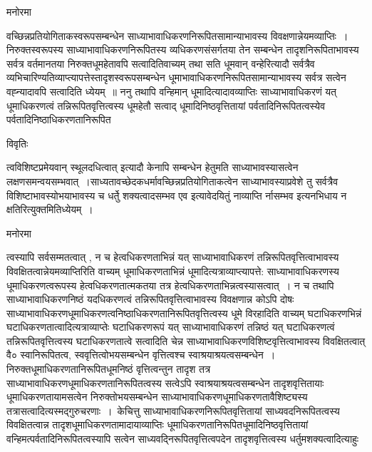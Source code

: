 \documentclass[10pt, openany]{book}
\begin{document}
{\begin{center}   मनोरमा  \end{center}
वच्छिन्नप्रतियोगिताकस्वरूपसम्बन्धेन साध्याभावाधिकरणनिरूपितसामान्याभावस्य विवक्षणान्नेयमव्याप्तिः~। निरुक्तस्वरूपस्य साध्याभावाधिकरणनिरूपितस्य व्यधिकरणसंसर्गतया तेन सम्बन्धेन तादृशनिरूपिताभावस्य सर्वत्र वर्तमानतया निरुक्तधूमहेतावपि सत्वादितिवाच्यम् तथा सति धूमवान् वन्हेरित्यादौ सर्वत्रैव
व्यभिचारिण्यतिव्याप्त्यापत्तेस्तादृशस्वरूपसम्बन्धेन धूमाभावाधिकरणनिरूपितसामान्याभावस्य सर्वत्र सत्वेन वह्न्यादावपि सत्वादिति ध्येयम्~॥ ननु तथापि वन्हिमान् धूमादित्यादावव्याप्तिः साध्याभावाधिकरणं यत् धूमाधिकरणत्वं तन्निरूपितवृत्तित्वस्य धूमहेतौ सत्वाद् धूमादिनिष्ठवृत्तितायां पर्वतादिनिरूपितत्वस्येव पर्वतादिनिष्ठाधिकरणतानिरूपित
\newpage
\begin{center}     विवृतिः \end{center}
{\la त्वविशिष्टप्रमेयवान् स्थूलदधित्वात् इत्यादौ केनापि सम्बन्धेन हेतुमति साध्याभावस्यासत्वेन लक्षणसमन्वयसम्भवात्~।साध्यतावच्छेदकधर्मावच्छिन्नप्रतियोगिताकत्वेन साध्याभावस्याप्रवेशे तु सर्वत्रैव विशिष्टाभावस्योभयाभावस्य च धर्तेु शक्यत्वादसम्भव एव इत्यावेदयितुं नाव्याप्ति र्नासम्भव इत्यनभिधाय न क्षतिरित्युक्तमितिध्येयम्~।}
\begin{center}   मनोरमा  \end{center}
त्वस्यापि सर्वसम्मतत्वात् , न च हेत्वधिकरणताभिन्नं यत् साध्याभावाधिकरणं तन्निरूपितवृत्तित्वाभावस्य विवक्षितत्वान्नेयमव्याप्तिरिति वाच्यम् धूमाधिकरणताभिन्नं
धूमादित्यत्राव्याप्त्यापत्ते: साध्याभावाधिकरणस्य धूमाधिकरणत्वरूपस्य हेत्वधिकरणतात्मकतया तत्र हेत्वधिकरणताभिन्नत्वस्यासत्वात्~। न च तथापि साध्याभावाधिकरणनिष्ठं यदधिकरणत्वं तन्निरूपितवृत्तित्वाभावस्य विवक्षणान्न कोऽपि दोषः साध्याभावाधिकरणधूमाधिकरणत्वनिष्ठाधिकरणतानिरूपितवृत्तित्वस्य धूमे विरहादिति वाच्यम् घटाधिकरणभिन्नं घटाधिकरणतात्वादित्यत्राव्याप्तेः घटाधिकरणरूपं यत् साध्याभावाधिकरणं तन्निष्ठं यत् घटाधिकरणत्वं तन्निरूपितवृत्तित्वस्य घटाधिकरणतात्वे सत्वादिति चेन्न साध्याभावाधिकरणविशिष्टवृत्तित्वाभावस्य विवक्षितत्वात् वै० स्वानिरूपितत्व, स्ववृत्तित्वोभयसम्बन्धेन वृत्तित्वश्च स्वाश्रयाश्रयत्वसम्बन्धेन~। निरुक्तधूमाधिकरणतानिरूपितधूमनिष्ठं वृत्तित्वन्तुन तादृश तत्र साध्याभावाधिकरणधूमाधिकरणतानिरूपितत्वस्य सत्वेऽपि स्वाश्रयाश्रयत्वसम्बन्धेन तादृशवृत्तितायाः धूमाधिकरणतायामसत्वेन निरुक्तोभयसम्बन्धेन साध्याभावाधिकरणधूमाधिकरणतावैशिष्ट्यस्य तत्रासत्वादित्यस्मद्गुरुचरणाः~।~{\la केचित्तु}
साध्याभावाधिकरणनिरूपितवृत्तितायां साध्यवदनिरूपितत्वस्य विवक्षितत्वान्न तादृशधूमाधिकरणतामादायाव्याप्तिः धूमाधिकरणतानिरूपितधूमादिनिष्ठवृत्तितायां वन्हिमत्पर्वतादिनिरूपितत्वस्यापि सत्वेन साध्यवद्निरूपितवृत्तित्वपदेन तादृशवृत्तित्वस्य धर्तुमशक्यत्वादित्याहुः

}
\end{document}
